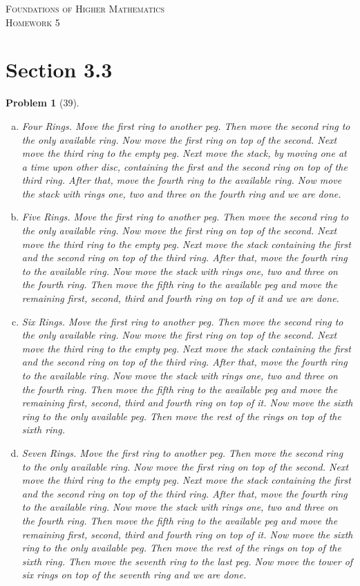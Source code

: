 \documentclass{article}
\theoremstyle{problem}
\newtheorem{prob}{Problem}
\theoremstyle{plain}
\theoremstyle{remark}
\begin{document}
\begin{center}
\textsc{\Large Foundations of Higher Mathematics}\\[.3cm]
\textsc{\Large Homework 5}
\end{center}

\section*{Section 3.3}
\begin{prob}[39]\ \\[-1cm]
  \begin{enumerate}[a)]
    \item \textit{Four Rings.} Move the first ring to another peg. Then move the second ring to the only available ring. Now move the first ring on top of the second. Next move the third ring to the empty peg. Next move the stack, by moving one at a time upon other disc, containing the first and the second ring on top of the third ring. After that, move the fourth ring to the available ring. Now move the stack with rings one, two and three on the fourth ring and we are done.
    \item \textit{Five Rings.}  Move the first ring to another peg. Then move the second ring to the only available ring. Now move the first ring on top of the second. Next move the third ring to the empty peg. Next move the stack containing the first and the second ring on top of the third ring. After that, move the fourth ring to the available ring. Now move the stack with rings one, two and three on the fourth ring. Then move the fifth ring to the available peg and move the remaining first, second, third and fourth ring on top of it and we are done.
    \item \textit{Six Rings.}  Move the first ring to another peg. Then move the second ring to the only available ring. Now move the first ring on top of the second. Next move the third ring to the empty peg. Next move the stack containing the first and the second ring on top of the third ring. After that, move the fourth ring to the available ring. Now move the stack with rings one, two and three on the fourth ring. Then move the fifth ring to the available peg and move the remaining first, second, third and fourth ring on top of it. Now move the sixth ring to the only available peg. Then move the rest of the rings on top of the sixth ring.
    \item \textit{Seven Rings.} Move the first ring to another peg. Then move the second ring to the only available ring. Now move the first ring on top of the second. Next move the third ring to the empty peg. Next move the stack containing the first and the second ring on top of the third ring. After that, move the fourth ring to the available ring. Now move the stack with rings one, two and three on the fourth ring. Then move the fifth ring to the available peg and move the remaining first, second, third and fourth ring on top of it. Now move the sixth ring to the only available peg. Then move the rest of the rings on top of the sixth ring. Then move the seventh ring to the last peg. Now move the tower of six rings on top of the seventh ring and we are done.

\end{enumerate}
\end{prob}
\end{document}

